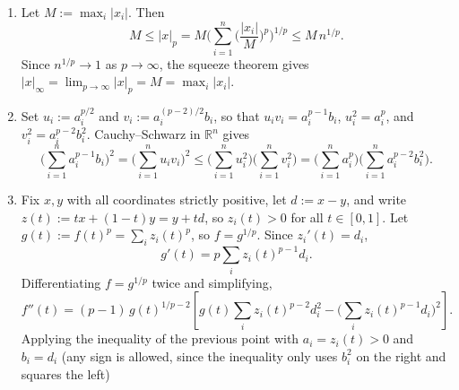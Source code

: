 \begin{exercisesolution}
\begin{enumerate}[label=\textbf{\arabic*.}]
\begin{center}
    \end{center}
  \item Let $M := \max_i |x_i|$. Then
    \[
    M \leq |x|_p = M\Big(\sum_{i=1}^{n}\Big(\frac{|x_i|}{M}\Big)^p\Big)^{1/p} \leq M\,n^{1/p}.
    \]
    Since $n^{1/p} \to 1$ as $p \to \infty$, the squeeze theorem gives $|x|_\infty = \lim_{p\to\infty}|x|_p = M = \max_i |x_i|$.
  \item Set $u_i := a_i^{p/2}$ and $v_i := a_i^{(p-2)/2}b_i$, so that $u_iv_i = a_i^{p-1}b_i$,
    $u_i^2 = a_i^p$, and $v_i^2 = a_i^{p-2}b_i^2$. Cauchy--Schwarz in $\mathbb{R}^n$ gives
    \[
    \Big(\sum_{i=1}^n a_i^{p-1}b_i\Big)^2 = \Big(\sum_{i=1}^n u_iv_i\Big)^2 \leq \Big(\sum_{i=1}^n u_i^2\Big)\Big(\sum_{i=1}^n v_i^2\Big) = \Big(\sum_{i=1}^n a_i^p\Big)\Big(\sum_{i=1}^n a_i^{p-2}b_i^2\Big).
    \]
  \item Fix $x, y$ with all coordinates strictly positive, let $d := x - y$, and write
    $z(t) := tx+(1-t)y = y + td$, so $z_i(t) > 0$ for all $t \in [0,1]$. Let $g(t) := f(t)^p =
    \sum_i z_i(t)^p$, so $f = g^{1/p}$. Since $z_i'(t) = d_i$,
    \[
    g'(t) = p\sum_i z_i(t)^{p-1}d_i.
    \]
    Differentiating $f = g^{1/p}$ twice and simplifying,
    \[
    f''(t) = (p-1)\,g(t)^{1/p-2}\left[g(t)\sum_i z_i(t)^{p-2}d_i^2 - \Big(\sum_i z_i(t)^{p-1}d_i\Big)^2\right].
    \]
    Applying the inequality of the previous point with $a_i = z_i(t) > 0$ and $b_i = d_i$ (any
    sign is allowed, since the inequality only uses $b_i^2$ on the right and squares the left)

\end{enumerate}
\end{exercisesolution}
